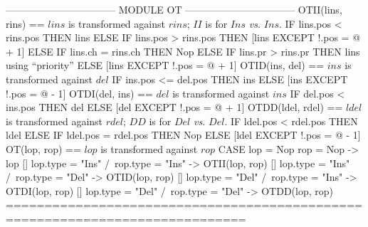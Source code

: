 \documentclass{article}
\begin{document}
\begin{tla}
--------------------------------- MODULE OT ---------------------------------
OTII(lins, rins) == \* $lins$ is transformed against $rins$; $II$ is for $Ins$ \emph{vs.} $Ins$.
    IF lins.pos < rins.pos THEN lins
    ELSE IF lins.pos > rins.pos
         THEN [lins EXCEPT !.pos = @ + 1]
         ELSE IF lins.ch = rins.ch THEN Nop
              ELSE IF lins.pr > rins.pr THEN lins \* using ``priority''
                   ELSE [lins EXCEPT !.pos = @ + 1]
OTID(ins, del) == \* $ins$ is transformed against $del$
    IF ins.pos <= del.pos THEN ins
                          ELSE [ins EXCEPT !.pos = @ - 1]
OTDI(del, ins) == \* $del$ is transformed against $ins$
    IF del.pos < ins.pos THEN del
                         ELSE [del EXCEPT !.pos = @ + 1]
OTDD(ldel, rdel) == \* $ldel$ is transformed against $rdel$; $DD$ is for $Del$ \emph{vs.} $Del$.
    IF ldel.pos < rdel.pos THEN ldel
    ELSE IF ldel.pos = rdel.pos THEN Nop
         ELSE [ldel EXCEPT !.pos = @ - 1]
OT(lop, rop) == \* $lop$ is transformed against $rop$
    CASE lop = Nop \/ rop = Nop -> lop
       []  lop.type = "Ins" /\ rop.type = "Ins" -> OTII(lop, rop)
       []  lop.type = "Ins" /\ rop.type = "Del" -> OTID(lop, rop)
       []  lop.type = "Del" /\ rop.type = "Ins" -> OTDI(lop, rop)
       []  lop.type = "Del" /\ rop.type = "Del" -> OTDD(lop, rop)
=============================================================================
\end{tla}
\end{document}
